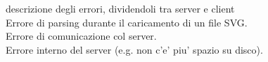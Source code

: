 



descrizione degli errori, dividendoli tra server e client\\
Errore di parsing durante il caricamento di un file SVG.\\
Errore di comunicazione col server. \\
Errore interno del server (e.g. non c'e' piu' spazio su disco).\\


